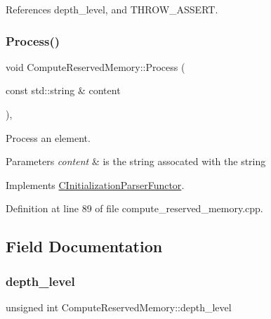 References depth\+\_\+level, and T\+H\+R\+O\+W\+\_\+\+A\+S\+S\+E\+RT.

\mbox{\label{classComputeReservedMemory_a2cb9e87cd6acac14021dede18b50f54b}} 
\subsubsection{\texorpdfstring{Process()}{Process()}}
{\footnotesize\ttfamily void Compute\+Reserved\+Memory\+::\+Process (\begin{DoxyParamCaption}\item[{const std\+::string \&}]{content }\end{DoxyParamCaption})\hspace{0.3cm}{\ttfamily [override]}, {\ttfamily [virtual]}}



Process an element. 


\begin{DoxyParams}{Parameters}
{\em content} & is the string assocated with the string \\
\hline
\end{DoxyParams}


Implements \hyperlink{classCInitializationParserFunctor_ac84560143f5dcbb961ba1a8f43fea9a1}{C\+Initialization\+Parser\+Functor}.



Definition at line 89 of file compute\+\_\+reserved\+\_\+memory.\+cpp.



\subsection{Field Documentation}
\mbox{\label{classComputeReservedMemory_a563f4a38587b3bf54e733dc0b3866e27}} 
\subsubsection{\texorpdfstring{depth\+\_\+level}{depth\_level}}
{\footnotesize\ttfamily unsigned int Compute\+Reserved\+Memory\+::depth\+\_\+level\hspace{0.3cm}{\ttfamily [private]}}



